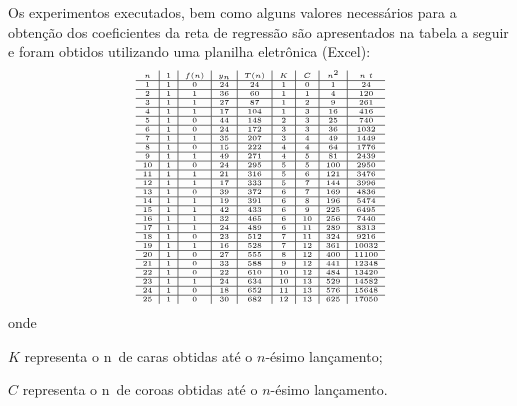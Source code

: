 

Os experimentos executados, bem como alguns valores necessários para a obtenção dos coeficientes da reta de regressão são apresentados na tabela a seguir e foram obtidos utilizando uma planilha eletrônica (Excel):
\[\tiny
\begin{array}{c|c|c|c|c|c|c|c|c}
n & 1 & f(n) & y_{n} & T(n) & K & C & n^2 & n\ t \\ \hline
1 & 1 & 0 & 24 & 24 & 1 & 0 & 1 & 24 \\ \hline
2 & 1 & 1 & 36 & 60 & 1 & 1 & 4 & 120 \\ \hline
3 & 1 & 1 & 27 & 87 & 1 & 2 & 9 & 261 \\ \hline
4 & 1 & 1 & 17 & 104 & 1 & 3 & 16 & 416 \\ \hline
5 & 1 & 0 & 44 & 148 & 2 & 3 & 25 & 740 \\ \hline
6 & 1 & 0 & 24 & 172 & 3 & 3 & 36 & 1032 \\ \hline
7 & 1 & 1 & 35 & 207 & 3 & 4 & 49 & 1449 \\ \hline
8 & 1 & 0 & 15 & 222 & 4 & 4 & 64 & 1776 \\ \hline
9 & 1 & 1 & 49 & 271 & 4 & 5 & 81 & 2439 \\ \hline
10 & 1 & 0 & 24 & 295 & 5 & 5 & 100 & 2950 \\ \hline
11 & 1 & 1 & 21 & 316 & 5 & 6 & 121 & 3476 \\ \hline
12 & 1 & 1 & 17 & 333 & 5 & 7 & 144 & 3996 \\ \hline
13 & 1 & 0 & 39 & 372 & 6 & 7 & 169 & 4836 \\ \hline
14 & 1 & 1 & 19 & 391 & 6 & 8 & 196 & 5474 \\ \hline
15 & 1 & 1 & 42 & 433 & 6 & 9 & 225 & 6495 \\ \hline
16 & 1 & 1 & 32 & 465 & 6 & 10 & 256 & 7440 \\ \hline
17 & 1 & 1 & 24 & 489 & 6 & 11 & 289 & 8313 \\ \hline
18 & 1 & 0 & 23 & 512 & 7 & 11 & 324 & 9216 \\ \hline
19 & 1 & 1 & 16 & 528 & 7 & 12 & 361 & 10032 \\ \hline
20 & 1 & 0 & 27 & 555 & 8 & 12 & 400 & 11100 \\ \hline
21 & 1 & 0 & 33 & 588 & 9 & 12 & 441 & 12348 \\ \hline
22 & 1 & 0 & 22 & 610 & 10 & 12 & 484 & 13420 \\ \hline
23 & 1 & 1 & 24 & 634 & 10 & 13 & 529 & 14582 \\ \hline
24 & 1 & 0 & 18 & 652 & 11 & 13 & 576 & 15648 \\ \hline
25 & 1 & 0 & 30 & 682 & 12 & 13 & 625 & 17050
\end{array}
\]
onde
\begin{description}
\item \(K\) representa o n\textordmasculine\ de caras obtidas até o \(n\)-ésimo lançamento;
\item \(C\) representa o n\textordmasculine\ de coroas obtidas até o \(n\)-ésimo lançamento.
\end{description}


